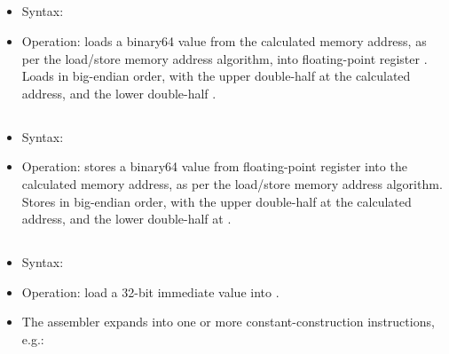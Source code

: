 \subsection{}

\begin{itemize}
  \item Syntax: 
  \item Operation: loads a binary64 value from the calculated memory address, as
        per the load/store memory address algorithm, into floating-point register
        . Loads in big-endian order, with the upper double-half at the
        calculated address, and the lower double-half .
\end{itemize}

\subsection{}

\begin{itemize}
  \item Syntax: 
  \item Operation: stores a binary64 value from floating-point register
         into the calculated memory address, as per the load/store
        memory address algorithm. Stores in big-endian order, with the upper
        double-half at the calculated address, and the lower double-half at
        .
\end{itemize}


\subsection{}

\begin{itemize}
  \item Syntax: 
  \item Operation: load a 32-bit immediate value into .
  \item The assembler expands  into one or more constant-construction
         instructions, e.g.:

        
        
\end{itemize}

\subsection{}

